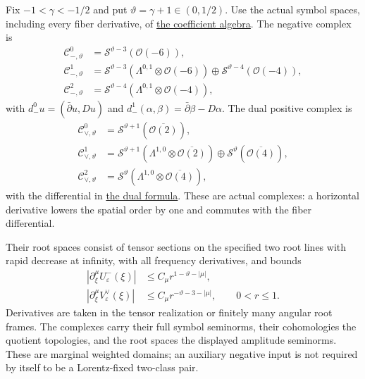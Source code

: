 \documentclass[
  english,
  11pt,
  reqno]{amsart}
\begin{document}
Fix \(-1<\gamma<-1/2\) and put \(\vartheta=\gamma+1\in(0,1/2)\). Use the
actual symbol spaces, including every fiber derivative, of
\hyperref[sec:online-actual-coefficient-complexes]{the coefficient
algebra}. The negative complex is%
 \[
\begin{aligned}
\mathscr C_{-,\vartheta}^{0}
&=\mathscr S^{\vartheta-3}(\mathcal O(-6)),\\
\mathscr C_{-,\vartheta}^{1}
&=\mathscr S^{\vartheta-3}
  (\Lambda^{0,1}\otimes\mathcal O(-6))
\oplus\mathscr S^{\vartheta-4}(\mathcal O(-4)),\\
\mathscr C_{-,\vartheta}^{2}
&=\mathscr S^{\vartheta-4}
  (\Lambda^{0,1}\otimes\mathcal O(-4)),
\end{aligned}
\] with \(d_-^0u=(\bar\partial u,Du)\) and
\(d_-^1(\alpha,\beta)=\bar\partial\beta-D\alpha\). The dual positive
complex is%
\[
\begin{aligned}
\mathscr C_{\vee,\vartheta}^{0}
&=\mathscr S^{\vartheta+1}(\overline{\mathcal O(2)}),\\
\mathscr C_{\vee,\vartheta}^{1}
&=\mathscr S^{\vartheta+1}
  (\Lambda^{1,0}\otimes\overline{\mathcal O(2)})
\oplus\mathscr S^{\vartheta}(\overline{\mathcal O(4)}),\\
\mathscr C_{\vee,\vartheta}^{2}
&=\mathscr S^{\vartheta}
  (\Lambda^{1,0}\otimes\overline{\mathcal O(4)}),
\end{aligned}
\] with the differential in
\hyperref[eq:online-dual-positive-differential]{the dual formula}. These
are actual complexes: a horizontal derivative lowers the spatial order
by one and commutes with the fiber differential.

Their root spaces consist of tensor sections on the specified two root
lines with rapid decrease at infinity, with all frequency derivatives,
and bounds%
 \[
\begin{aligned}
|\partial_\xi^\mu U^-_\varepsilon(\xi)|
&\le C_\mu r^{1-\vartheta-|\mu|},\\
|\partial_\xi^\mu V^\vee_\varepsilon(\xi)|
&\le C_\mu r^{-\vartheta-3-|\mu|},
\qquad 0<r\le1.
\end{aligned}
\] Derivatives are taken in the tensor realization or finitely many
angular root frames. The complexes carry their full symbol seminorms,
their cohomologies the quotient topologies, and the root spaces the
displayed amplitude seminorms. These are marginal weighted domains; an
auxiliary negative input is not required by itself to be a Lorentz-fixed
two-class pair.
\end{document}
